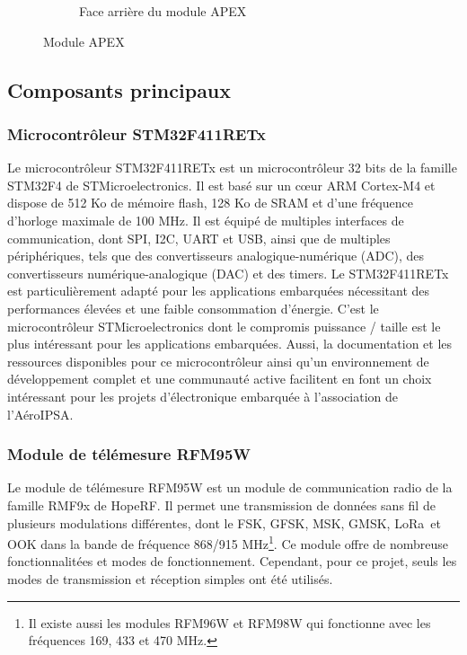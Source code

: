 \documentclass{article}
\begin{document}
\begin{figure}[h]
\begin{subfigure}{0.48\textwidth}
        \caption{Face arrière du module APEX}
        \label{fig:apex_back}
    \end{subfigure}
    \caption{Module APEX}
    \label{fig:apex}
\end{figure}

\subsection{Composants principaux}
\subsubsection{Microcontrôleur STM32F411RETx}
Le microcontrôleur STM32F411RETx est un microcontrôleur 32 bits de la famille STM32F4 de
STMicroelectronics. Il est basé sur un cœur ARM Cortex-M4 et dispose de 512 Ko de mémoire
flash, 128 Ko de SRAM et d'une fréquence d'horloge maximale de 100 MHz. Il est équipé de
multiples interfaces de communication, dont SPI, I2C, UART et USB, ainsi que de
multiples périphériques, tels que des convertisseurs analogique-numérique (ADC), des
convertisseurs numérique-analogique (DAC) et des timers. Le STM32F411RETx est
particulièrement adapté pour les applications embarquées nécessitant des performances
élevées et une faible consommation d'énergie. C'est le microcontrôleur STMicroelectronics
dont le compromis puissance / taille est le plus intéressant pour les applications
embarquées. Aussi, la documentation et les ressources disponibles pour ce
microcontrôleur ainsi qu'un environnement de développement complet et une communauté
active facilitent en font un choix intéressant pour les projets d'électronique
embarquée à l'association de l'AéroIPSA.\\

\subsubsection{Module de télémesure RFM95W}
Le module de télémesure RFM95W est un module de communication radio de la famille RMF9x
de HopeRF. Il permet une transmission de données sans fil de plusieurs modulations
différentes, dont le FSK, GFSK, MSK, GMSK, LoRa\texttrademark \ et OOK dans la bande de
fréquence 868/915 MHz\footnote{Il existe aussi les modules RFM96W et RFM98W qui
fonctionne avec les fréquences 169, 433 et 470 MHz.}. Ce module offre de nombreuse
fonctionnalitées et modes de fonctionnement. Cependant, pour ce projet, seuls les modes de
transmission et réception simples ont été utilisés.
\end{document}

